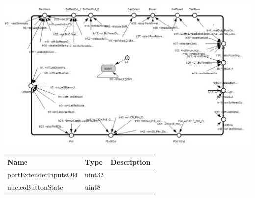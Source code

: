 {
\centering{}
\includegraphics[width=1.0\textwidth]{./images/ASimulationPlatformHW_1_0_behavior.jpg}
}

\begin{par}

\end{par}


\begin{tabular}[ht]{|l|l|p{8cm}|}
\hline
\textbf{Name} & \textbf{Type} & \textbf{Description}\\
\hline
portExtenderInputsOld & uint32 & \\
\hline
nucleoButtonState & uint8 & \\
\hline
\end{tabular}

